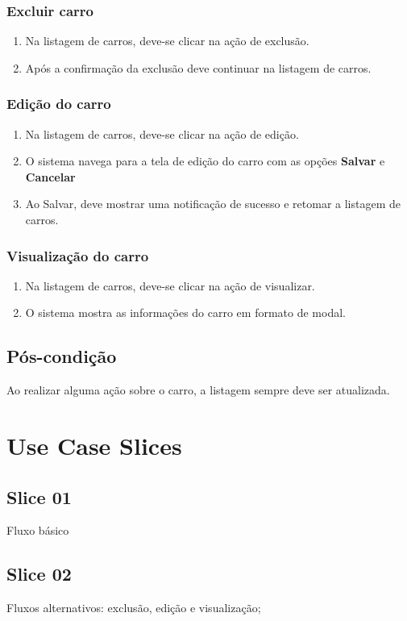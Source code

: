 \documentclass{article}
\begin{document}
\subsubsection{Excluir carro}
\begin{enumerate}
    \item Na listagem de carros, deve-se clicar na ação de exclusão.
    \item Após a confirmação da exclusão deve continuar na listagem de carros.
\end{enumerate}

\subsubsection{Edição do carro}
\begin{enumerate}
    \item Na listagem de carros, deve-se clicar na ação de edição.
    \item O sistema navega para a tela de edição do carro com as opções \textbf{Salvar} e \textbf{Cancelar}
    \item Ao Salvar, deve mostrar uma notificação de sucesso e retomar a listagem de carros.
\end{enumerate}

\subsubsection{Visualização do carro}
\begin{enumerate}
    \item Na listagem de carros, deve-se clicar na ação de visualizar.
    \item O sistema mostra as informações do carro em formato de modal.
\end{enumerate}

\subsection{Pós-condição}
Ao realizar alguma ação sobre o carro, a listagem sempre deve ser atualizada.

\section{Use Case Slices}
\subsection{Slice 01}
Fluxo básico

\subsection{Slice 02}
Fluxos alternativos: exclusão, edição e visualização;
\end{document}
